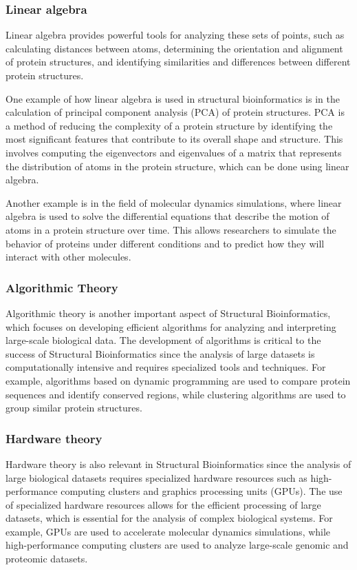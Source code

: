 \documentclass[]{final_report}
\begin{document}
\subsubsection{Linear algebra}

Linear algebra provides powerful tools for analyzing these sets of points, such as calculating distances between atoms, determining the orientation and alignment of protein structures, and identifying similarities and differences between different protein structures.

One example of how linear algebra is used in structural bioinformatics is in the calculation of principal component analysis (PCA) of protein structures. PCA is a method of reducing the complexity of a protein structure by identifying the most significant features that contribute to its overall shape and structure. This involves computing the eigenvectors and eigenvalues of a matrix that represents the distribution of atoms in the protein structure, which can be done using linear algebra.

Another example is in the field of molecular dynamics simulations, where linear algebra is used to solve the differential equations that describe the motion of atoms in a protein structure over time. This allows researchers to simulate the behavior of proteins under different conditions and to predict how they will interact with other molecules.

\subsubsection{Algorithmic Theory}
Algorithmic theory is another important aspect of Structural Bioinformatics, which focuses on developing efficient algorithms for analyzing and interpreting large-scale biological data. The development of algorithms is critical to the success of Structural Bioinformatics since the analysis of large datasets is computationally intensive and requires specialized tools and techniques. For example, algorithms based on dynamic programming are used to compare protein sequences and identify conserved regions, while clustering algorithms are used to group similar protein structures.

\subsubsection{Hardware theory}
Hardware theory is also relevant in Structural Bioinformatics since the analysis of large biological datasets requires specialized hardware resources such as high-performance computing clusters and graphics processing units (GPUs). The use of specialized hardware resources allows for the efficient processing of large datasets, which is essential for the analysis of complex biological systems. For example, GPUs are used to accelerate molecular dynamics simulations, while high-performance computing clusters are used to analyze large-scale genomic and proteomic datasets.
\end{document}
